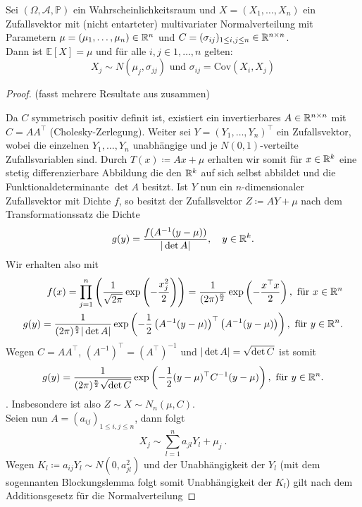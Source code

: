 \begin{Satz}
	Sei $ (\Omega,\mathcal{A},\mathbb{P}) $ ein Wahrscheinlichkeitsraum und $ X = (X_1,\dots,X_n) $ ein Zufallsvektor mit (nicht entarteter) multivariater Normalverteilung mit Parametern $ \mu = (\mu_1,\dots,\mu_n) \in \mathbb{R}^n $ und $ C = (\sigma_{ij})_{1 \leq i,j \leq n} \in \mathbb{R}^{n \times n} $.\\
	Dann ist $ \mathbb{E}[X] = \mu $ und für alle $ i,j \in {1,\dots,n}  $ gelten:
	\[
		 X_j \sim N(\mu_j,\sigma_{jj}) \text{ und } \sigma_{ij} = \text{Cov}(X_i,X_j)
	\]
\end{Satz}
\begin{proof}(fasst mehrere Resultate aus \cite{brokate2016grundwissen} zusammen)
	
	Da $ C $ symmetrisch positiv definit ist, existiert ein invertierbares $ A \in \mathbb{R}^{n \times n} $ mit $ C = AA^{\top} $ (Cholesky-Zerlegung).
	Weiter sei $ Y = (Y_1,\dots,Y_n)^{\top} $ ein Zufallsvektor, wobei die einzelnen $ Y_1,\dots,Y_n $ unabhängige und je $ N(0,1) $-verteilte Zufallsvariablen sind. 
	Durch $ T(x) \coloneqq Ax + \mu $ erhalten wir somit für $ x \in \mathbb{R}^k $ eine stetig differenzierbare Abbildung die den $ \mathbb{R}^k $ auf sich selbst abbildet und die Funktionaldeterminante $ \det A$ besitzt.
	Ist $ Y $ nun ein $ n $-dimensionaler Zufallsvektor mit Dichte $ f $, so besitzt der Zufallsvektor $ Z \coloneqq  AY + \mu$ nach dem Transformationssatz die Dichte
	\[
		g(y) = \frac{f(A^{-1}(y-\mu))}{| \det A |}, \quad y \in \mathbb{R}^k .
	\]
	Wir erhalten also mit 
	\begin{align*}
		f(x) = \prod_{j=1}^n \left( \frac{1}{\sqrt{2\pi}}\exp\left(-\frac{x_j^2}{2}\right) \right) = \frac{1}{(2\pi)^{\frac{n}{2}}} \exp \left( - \frac{x^{\top}x}{2}\right), \text{ für } x \in \mathbb{R}^n \\
		g(y) = \frac{1}{(2\pi)^{\frac{n}{2}}| \det A |} \exp \left( - \frac{1}{2} \left( A^{-1}(y-\mu)\right)^{\top}\left( A^{-1}(y-\mu)\right)\right), \text{ für }y \in \mathbb{R}^n .
	\end{align*}
	Wegen $ C = A A^{\top} $, $ (A^{-1})^{\top} = (A^{\top})^{-1} $ und $ | \det A | = \sqrt{\det C} $ ist somit 
	\[
		g(y) = \frac{1}{(2\pi)^{\frac{n}{2}}\sqrt{\det C}} \exp \left( - \frac{1}{2} (y-\mu)^{\top}C^{-1} (y-\mu)\right), \text{ für }y \in \mathbb{R}^n.
	\]. 
	Insbesondere ist also $ Z \sim X \sim N_n(\mu,C) $.\\
	Seien nun $ A = (a_{ij})_{1 \leq i,j \leq n} $, dann folgt
	\[
		X_j \sim \sum_{l=1}^n a_{jl} Y_l + \mu_j \ .
	\]
	Wegen $ K_l \coloneqq a_{ij} Y_l  \sim N(0,a_{jl}^2) $ und der Unabhängigkeit der $ Y_l $ (mit dem sogennanten Blockungslemma folgt somit Unabhängigkeit der $ K_l $) gilt nach dem Additionsgesetz für die Normalverteilung 

\end{proof}
